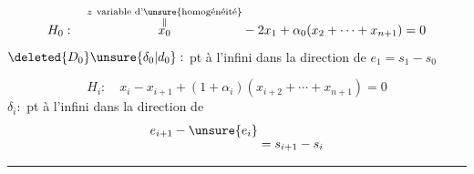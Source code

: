 \[
H_0:\quad\overset{\substack{z\ \text{variable d'\unsure{homogénéité}}\\\Vert}}{x_0}-2x_1+\alpha_0(x_2+\cdots+x_{n+1})=0
\]
$\deleted{D_0}\unsure{\delta_0|d_0}:$ pt à l'infini dans la direction de $e_1=s_1-s_0$

\[
H_i:\quad x_i-x_{i+1}+(1+\alpha_i)(x_{i+2}+\cdots+x_{n+1})=0
\]
$\delta_i:$ pt à l'infini dans la direction de
\[
\begin{aligned}
e_{i+1}-\unsure{e_i}&\\[-1ex]
&=s_{i+1}-s_i
\end{aligned}
\]
\noindent\rule{3cm}{.4pt}
